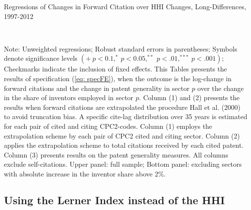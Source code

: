 \begin{table}
\caption{Regressions of Changes in Forward Citation over HHI Changes, Long-Differences,
1997-2012\label{tab: RegFwdCite-1}}

\begin{centering}
\par\end{centering}

\begin{centering}
\\
\par\end{centering}
\raggedright{}{\small{}Note: Unweighted regressions; Robust standard
errors in parentheses; Symbols denote significance levels $\left(+\ p<0.1,^{*}\ p<0.05,^{**}\ p<.01,^{***}\ p<.001\right)$;
Checkmarks indicate the inclusion of fixed effects. This Tables presents
the results of specification (\ref{eq: specFE}), when the outcome
is the log-change in forward citations and the change in patent generality
in sector $p$ over the change in the share of inventors employed
in sector $p$. Column (1) and (2) presents the results when forward
citations are extrapolated the procedure Hall et al. (2000) to avoid
truncation bias. A specific cite-lag distribution over 35 years is
estimated for each pair of cited and citing CPC2-codes. Column (1)
employs the extrapolation scheme by each pair of CPC2 cited and citing
sector. Column (2) applies the extrapolation scheme to total citations
received by each cited patent. Column (3) presents results on the
patent generality measures. All columns exclude self-citations. Upper
panel: full sample; Bottom panel: excluding sectors with absolute
increase in the inventor share above 2\%.}{\small\par}
\end{table}


\subsection{Using the Lerner Index instead of the HHI\label{app:Using-the-Lerner}}

